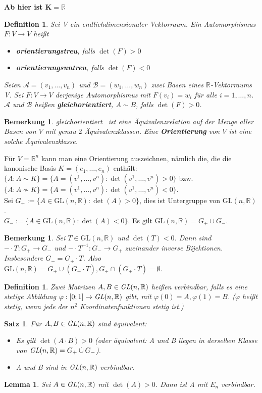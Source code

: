 \documentclass[12pt,a4paper]{article}
\theoremstyle{plain}
\newtheorem{Satz}[Theorem]{Satz}
\newtheorem{Lemma}[Theorem]{Lemma}
\newtheorem{Definition}[Theorem]{Definition}
\newtheorem{Bemerkung}[Theorem]{Bemerkung}
\newcommand{\herv}[1]{{\emph{\textbf{#1}}}}
\newcommand{\R}{\mathbb{R}}
\newcommand{\cupdot}{\mathbin{\dot{\cup}}}
\numberwithin{equation}{section}
\begin{document}
\textbf{Ab hier ist $\mathbf{K=\R}$}
\begin{Definition}
Sei V ein endlichdimensionaler Vektorraum. Ein Automorphismus $F:V\rightarrow V$ heißt \begin{itemize}
\item \herv{orientierungstreu}, falls $\det(F)>0$
\item \herv{orientierungsuntreu}, falls $\det(F)<0$
\end{itemize}
Seien $\mathcal{A}=(v_1,\ldots,v_n)$ und $\mathcal{B}=(w_1,\ldots,w_n)$ zwei Basen eines $\R$-Vektorraums V. Sei $F:V\rightarrow V$ derjenige Automorphismus mit $F(v_i)=w_i$ für alle $i=1,\ldots,n$. $\mathcal{A}$ und $\mathcal{B}$ heißen \herv{gleichorientiert}, $A\sim B$, falls $\det(F)>0$.
\end{Definition}
\begin{Bemerkung}
\glqq gleichorientiert \grqq\ ist eine Äquivalenzrelation auf der Menge aller Basen von $V$ mit genau $2$ Äquivalenzklassen. Eine \herv{Orientierung} von $V$ ist eine solche Ä\-qui\-va\-lenz\-klas\-se.
\end{Bemerkung}
Für $V=\R^n$ kann man eine Orientierung auszeichnen, nämlich die, die die kanonische Basis $K=(e_1,\ldots,e_n)$ enthält: $\{A:A\sim K\}=\{A=(v^1,\ldots,v^n):\det(v^1,\ldots,v^n)>0\}$ bzw. $\{A:A\not\sim K\}=\{A=(v^1,\ldots,v^n):\det(v^1,\ldots,v^n)<0\}$.\\
Sei $G_+:=\{A\in \text{GL}(n,\R):\det(A)>0\}$, dies ist Untergruppe von $\text{GL}(n,\R)$.\\
$G_-:=\{A\in \text{GL}(n,\R):\det(A)<0\}$. Es gilt $\text{GL}(n,\R)=G_+\cup G_{-}$.
\begin{Bemerkung}
Sei $T\in \text{GL}(n,\R)$ und $\det(T)<0$. Dann sind $-\cdot T: G_{+}\rightarrow G_-$ und $-\cdot T^{-1} : G_-\rightarrow G_+$ zueinander inverse Bijektionen. Insbesondere $G_-=G_+\cdot T$. Also $\text{GL}(n,\R)=G_+\cup (G_+\cdot T), G_+\cap(G_+\cdot T)=\emptyset$.
\end{Bemerkung}
\begin{Definition}
Zwei Matrizen $A,B\in \emph{GL}(n,\R)$ heißen verbindbar, falls es eine stetige Abbildung $\varphi:[0;1]\rightarrow \emph{GL}(n,\R)$ gibt, mit $\varphi(0)=A, \varphi(1)=B$. ($\varphi$ heißt stetig, wenn jede der $n^2$ Koordinatenfunktionen stetig ist.)
\end{Definition}
\begin{Satz}
Für $A,B\in \emph{GL}(n,\R)$ sind äquivalent:
\begin{itemize}
\renewcommand{\labelenumi}{\emph{(\roman{enumi})}}
\item Es gilt $\det(A\cdot B)>0$ (oder äquivalent: A und B liegen in derselben Klasse von $\emph{GL}(n,\R)=G_+\cupdot G_-$).
\item A und B sind in $\emph{GL}(n,\R)$ verbindbar.
\end{itemize}
\end{Satz}
\begin{Lemma}
Sei $A\in \emph{GL}(n,\R)$ mit $\det(A)>0$. Dann ist A mit $E_n$ verbindbar.
\end{Lemma}
\end{document}
